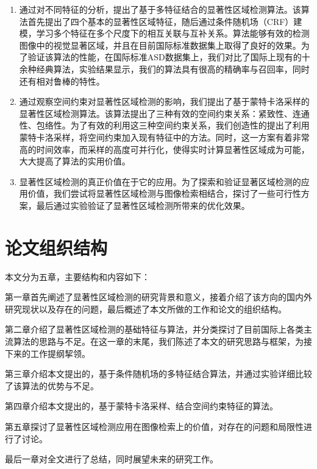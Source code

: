 \begin{enumerate}
\item 通过对不同特征的分析，提出了基于多特征结合的显著性区域检测算法。该算法首先提出了四个基本的显著性区域特征，随后通过条件随机场（CRF）建模，学习多个特征在多个尺度下的相互关联与互补关系。算法能够有效的检测图像中的视觉显著区域，并且在目前国际标准数据集上取得了良好的效果。为了验证该算法的性能，在国际标准ASD数据集上，我们对比了国际上现有的十余种经典算法，实验结果显示，我们的算法具有很高的精确率与召回率，同时还有相对鲁棒的特性。
\item 通过观察空间约束对显著性区域检测的影响，我们提出了基于蒙特卡洛采样的显著性区域检测算法。该算法提出了三种有效的空间约束关系：紧致性、连通性、包络性。为了有效的利用这三种空间约束关系，我们创造性的提出了利用蒙特卡洛采样，将空间约束加入现有特征中的方法。同时，这一方案有着非常高的时间效率，而采样的高度可并行化，使得实时计算显著性区域成为可能，大大提高了算法的实用价值。
\item 显著性区域检测的真正价值在于它的应用。为了探索和验证显著区域检测的应用价值，我们尝试将显著性区域检测与图像检索相结合，探讨了一些可行性方案，最后通过实验验证了显著性区域检测所带来的优化效果。
\end{enumerate}

\section{论文组织结构}
本文分为五章，主要结构和内容如下：

第一章首先阐述了显著性区域检测的研究背景和意义，接着介绍了该方向的国内外研究现状以及存在的问题，最后概述了本文所做的工作和论文的组织结构。

第二章介绍了显著性区域检测的基础特征与算法，并分类探讨了目前国际上各类主流算法的思路与不足。在这一章的末尾，我们陈述了本文的研究思路与框架，为接下来的工作提纲挈领。

第三章介绍本文提出的，基于条件随机场的多特征结合算法，并通过实验详细比较了该算法的优势与不足。

第四章介绍本文提出的，基于蒙特卡洛采样、结合空间约束特征的算法。

第五章探讨了显著性区域检测应用在图像检索上的价值，对存在的问题和局限性进行了讨论。

最后一章对全文进行了总结，同时展望未来的研究工作。
